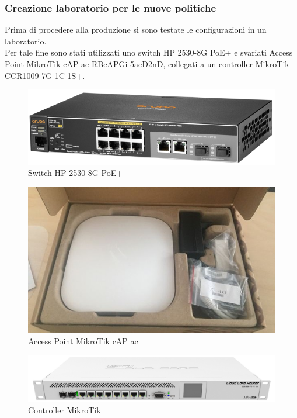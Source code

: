 \documentclass[Realizzazione.tex]{subfiles}
\begin{document}
\subsubsection{Creazione laboratorio per le nuove politiche}
Prima di procedere alla produzione si sono testate le configurazioni in un laboratorio. \\
Per tale fine sono stati utilizzati uno switch HP 2530-8G PoE+ e svariati Access Point MikroTik cAP ac RBcAPGi-5acD2nD, collegati a un controller MikroTik CCR1009-7G-1C-1S+.

\begin{figure}[H]
	\centering
	\includegraphics[width=0.6\linewidth]{"images/HP"}
	\caption{Switch HP 2530-8G PoE+}
	\label{fig:Switch HP 2530-8G PoE+}
\end{figure}
\begin{figure}[H]
	\centering
	\includegraphics[width=0.6\linewidth]{"images/AP"}
	\caption{Access Point MikroTik cAP ac}
	\label{fig:Access Point MikroTik cAP ac}
\end{figure}
\begin{figure}[H]
	\centering
	\includegraphics[width=0.6\linewidth]{"images/Router"}
	\caption{Controller MikroTik}
	\label{fig:Controller MikroTik}
\end{figure}
\end{document}
